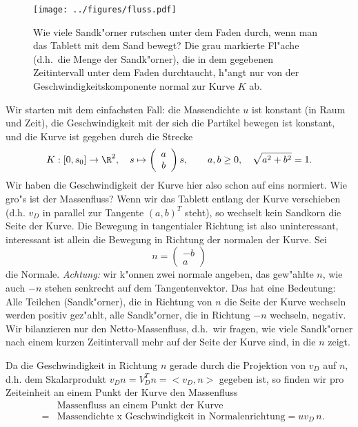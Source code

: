 \begin{figure}[htbp] %
   \centering
   \texttt{[image: ../figures/fluss.pdf]} 
   \caption{Wie viele Sandk"orner rutschen unter dem Faden durch, wenn man das Tablett mit dem Sand bewegt? Die grau markierte Fl"ache (d.h.\ die Menge der Sandk"orner), die in dem gegebenen Zeitintervall 
unter dem Faden durchtaucht,  h"angt nur von 
der Geschwindigkeitskomponente normal zur Kurve $K$ ab.}
   \label{fig:flss}
\end{figure}

\par\medskip
Wir starten mit dem einfachsten Fall: die Massendichte $u$ ist konstant (in Raum und Zeit), die Geschwindigkeit mit der sich die Partikel bewegen ist konstant, und die Kurve ist gegeben durch die Strecke
$$ K:[0,s_0]\rightarrow\R^2,\quad s\mapsto 
\left(\begin{array}{c}a\\b
\end{array}\right)s,\qquad a,b\geq 0,\quad \sqrt{a^2+b^2}=1.$$
Wir haben die Geschwindigkeit der Kurve hier also schon auf eins normiert. 
Wie gro"s ist der Massenfluss? Wenn wir das Tablett entlang der Kurve verschieben (d.h. $v_D$ in parallel zur Tangente $(a,b)^T$ steht), so wechselt
kein Sandkorn die Seite der Kurve. Die Bewegung in tangentialer Richtung ist 
also uninteressant, interessant ist allein die Bewegung in Richtung der normalen der Kurve. Sei
$$ n = \left(\begin{array}{c}-b\\a
\end{array}\right)$$
die Normale.
{\it Achtung:} wir k"onnen zwei normale angeben, das gew"ahlte $n$, 
wie auch $-n$ stehen senkrecht auf dem Tangentenvektor. Das hat eine Bedeutung: Alle Teilchen (Sandk"orner), die in Richtung von $n$ die Seite 
der Kurve wechseln werden positiv gez"ahlt, alle Sandk"orner, die in Richtung $-n$ wechseln, negativ. Wir bilanzieren nur den Netto-Massenfluss, d.h.\ wir
fragen, wie viele Sandk"orner nach einem kurzen Zeitintervall mehr auf der
Seite der Kurve sind, in die $n$ zeigt.\par
Da die Geschwindigkeit in Richtung $n$ gerade durch die Projektion von $v_D$
auf $n$, d.h. dem Skalarprodukt $v_D n = V_D^Tn = <v_D,n>$ gegeben ist, 
so finden wir pro Zeiteinheit an einem Punkt der Kurve den Massenfluss 
\begin{eqnarray*}
 &&\mbox{Massenfluss an einem Punkt der Kurve}\\
& =& \mbox{Massendichte x Geschwindigkeit in Normalenrichtung} = u v_D\, n.
\end{eqnarray*}
